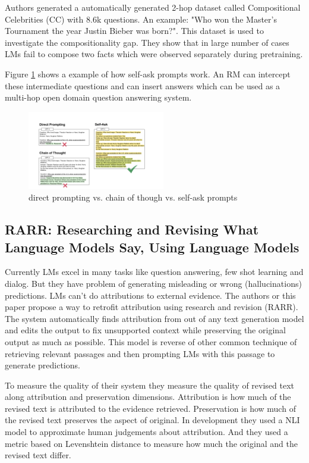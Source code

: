 \documentclass{article}
\begin{document}
Authors generated a automatically generated 2-hop dataset called Compositional Celebrities (CC) with 8.6k questions. An example: "Who won the Master's Tournament the year Justin Bieber was born?". This dataset is used to investigate the compositionality gap. They show that in large number of cases LMs fail to compose two facts which were observed separately during pretraining. 

Figure \ref{fig:self-ask} shows a example of how self-ask prompts work. An RM can intercept these intermediate questions and can insert answers which can be used as a multi-hop open domain question answering system.

\begin{figure}[htp]
    \centering
    \includegraphics[width=6cm]{self-ask-prompts.png}
    \caption{direct prompting vs. chain of though vs. self-ask prompts\cite{https://doi.org/10.48550/arxiv.2210.03350}}
    \label{fig:self-ask}
\end{figure}

  \subsection{RARR: Researching and Revising What Language Models Say, Using Language Models \cite{https://doi.org/10.48550/arxiv.2210.08726}}
Currently LMs excel in many tasks like question answering, few shot learning and dialog. But they have problem of generating misleading or wrong (hallucinations) predictions. LMs can't do attributions to external evidence. The authors or this paper propose a way to retrofit attribution using research and revision (RARR). The system automatically finds attribution from out of any text generation model and edits the output to fix unsupported context while preserving the original output as much as possible. This model is reverse of other common technique of retrieving relevant passages and then prompting LMs with this passage to generate predictions. 

To measure the quality of their system they measure the quality of revised text along attribution and preservation dimensions. Attribution is how much of the revised text is attributed to the evidence retrieved. Preservation is how much of the revised text preserves the aspect of original. In development they used a NLI model to approximate human judgements about attribution. And they used a metric based on Levenshtein distance to measure how much the original and the revised text differ.
\end{document}
